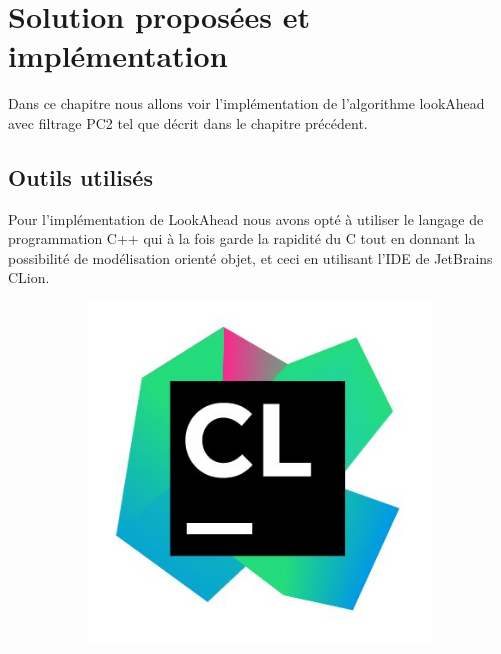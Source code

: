 \documentclass[12pt]{report}
\begin{document}
	
	
\chapter{Solution proposées et implémentation}
Dans ce chapitre nous allons voir l'implémentation de l'algorithme lookAhead avec filtrage PC2 tel que décrit dans le chapitre précédent.
\section{Outils utilisés}
Pour l’implémentation de LookAhead nous avons opté à utiliser le langage de programmation C++ qui à la fois garde la rapidité du C tout en donnant la possibilité de modélisation orienté objet, et ceci en utilisant l'IDE de JetBrains CLion.
\begin{figure}[H]
	\centering
	\begin{subfigure}{.5\textwidth}
		\centering
		\includegraphics[scale=0.3]{imgs/Clion.jpg}
		\label{fig:sub1}
	\end{subfigure}%
	\begin{subfigure}{.5\textwidth}
		\centering

\end{subfigure}
\end{figure}
\end{document}
